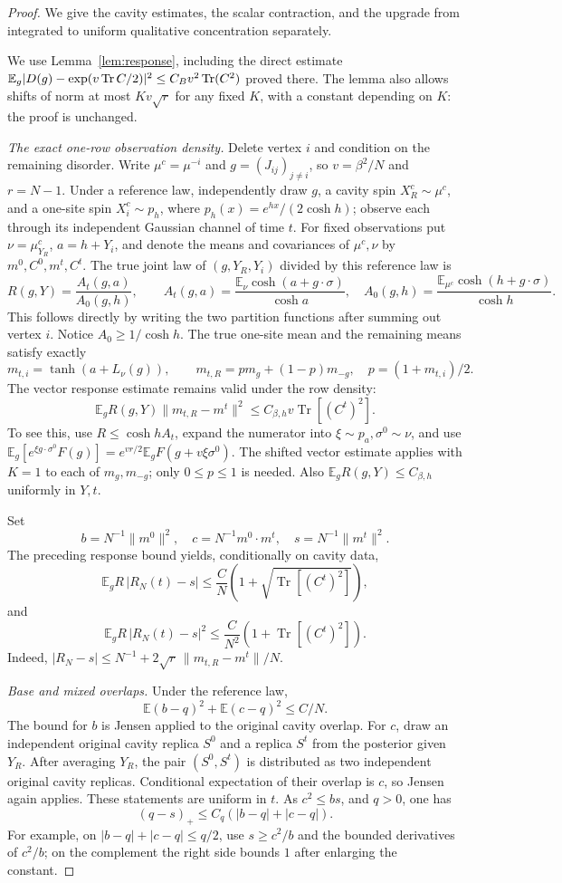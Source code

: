 \documentclass[11pt,reqno]{amsart}
\newcommand{\Tr}{\operatorname{Tr}}
\begin{document}
\begin{proof}
We give the cavity estimates, the scalar contraction, and the upgrade from
integrated to uniform qualitative concentration separately.

We use Lemma~\ref{lem:response}, including the direct estimate
$\bbE_g|D(g)-\exp(v\Tr C/2)|^2\le C_Bv^2\Tr(C^2)$ proved there.
The lemma also allows shifts of norm at most $K v\sqrt r$ for any fixed
$K$, with a constant depending on $K$: the proof is unchanged.

\medskip\noindent\emph{The exact one-row observation density.}
Delete vertex $i$ and condition on the remaining disorder. Write
$\mu^c=\mu^{-i}$ and $g=(J_{ij})_{j\ne i}$, so $v=\beta^2/N$ and $r=N-1$.
Under a reference law, independently draw $g$, a cavity spin $X_R^c\sim\mu^c$,
and a one-site spin $X_i^c\sim p_h$, where
$p_h(x)=e^{hx}/(2\cosh h)$; observe each through its independent Gaussian
channel of time $t$.
For fixed observations put $\nu=\mu^c_{Y_R}$, $a=h+Y_i$, and denote the
means and covariances of $\mu^c,\nu$ by $m^0,C^0,m^t,C^t$.
The true joint law of $(g,Y_R,Y_i)$ divided by this reference law is
\[
 R(g,Y)=\frac{A_t(g,a)}{A_0(g,h)},\qquad
 A_t(g,a)=\frac{\mathbb E_\nu\cosh(a+g\cdot\sigma)}{\cosh a},\quad
 A_0(g,h)=\frac{\mathbb E_{\mu^c}\cosh(h+g\cdot\sigma)}{\cosh h}.
\]
This follows directly by writing the two partition functions after summing
out vertex $i$. Notice $A_0\ge1/\cosh h$.
The true one-site mean and the remaining means satisfy exactly
\[
 m_{t,i}=\tanh(a+L_\nu(g)),\qquad
 m_{t,R}=p m_g+(1-p)m_{-g},\quad p=(1+m_{t,i})/2.
\]
The vector response estimate remains valid under the row density:
\[
 \mathbb E_g R(g,Y)\|m_{t,R}-m^t\|^2
 \le C_{\beta,h}v\operatorname{Tr}[(C^t)^2].
\]
To see this, use $R\le\cosh h A_t$, expand the numerator into
$\xi\sim p_a,\sigma^0\sim\nu$, and use
$\mathbb E_g[e^{\xi g\cdot\sigma^0}F(g)]
=e^{vr/2}\mathbb E_gF(g+v\xi\sigma^0)$.
The shifted vector estimate applies with $K=1$ to each of $m_g,m_{-g}$;
only $0\le p\le1$ is needed.
Also $\mathbb E_gR(g,Y)\le C_{\beta,h}$ uniformly in $Y,t$.

Set
\[
 b=N^{-1}\|m^0\|^2,\quad c=N^{-1}m^0\cdot m^t,\quad
 s=N^{-1}\|m^t\|^2.
\]
The preceding response bound yields, conditionally on cavity data,
\[
 \mathbb E_g R\,|R_N(t)-s|
 \le \frac{C}{N}\left(1+\sqrt{\operatorname{Tr}[(C^t)^2]}\right),
\]
and
\[
 \mathbb E_g R\,|R_N(t)-s|^2
 \le \frac{C}{N^2}\left(1+\operatorname{Tr}[(C^t)^2]\right).
\]
Indeed, $|R_N-s|\le N^{-1}+2\sqrt r\,\|m_{t,R}-m^t\|/N$.

\medskip\noindent\emph{Base and mixed overlaps.}
Under the reference law,
\[
 \mathbb E(b-q)^2+\mathbb E(c-q)^2\le C/N.
\]
The bound for $b$ is Jensen applied to the original cavity overlap.
For $c$, draw an independent original cavity replica $S^0$ and a replica
$S^t$ from the posterior given $Y_R$. After averaging $Y_R$, the pair
$(S^0,S^t)$ is distributed as two independent original cavity replicas.
Conditional expectation of their overlap is $c$, so Jensen again applies.
These statements are uniform in $t$.
As $c^2\le bs$, and $q>0$, one has
\[
 (q-s)_+\le C_q(|b-q|+|c-q|).
\]
For example, on $|b-q|+|c-q|\le q/2$, use $s\ge c^2/b$ and the bounded
derivatives of $c^2/b$; on the complement the right side bounds $1$ after
enlarging the constant.


\end{proof}
\end{document}
